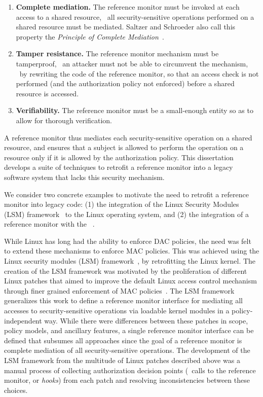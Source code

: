 \begin{enumerate}

\item \textbf{Complete mediation.} The reference monitor must be invoked at
each access to a shared resource, \ie~all security-sensitive operations
performed on a shared resource must be mediated. Saltzer and Schroeder also
call this property the \textit{Principle of Complete Mediation}~\cite{ss75}.

\item \textbf{Tamper resistance.} The reference monitor mechanism must
be tamperproof, \ie~an attacker must not be able to circumvent the mechanism,
\eg~by rewriting the code of the reference monitor, so that an access check is
not performed (and the authorization policy not enforced) before a shared
resource is accessed. 

\item \textbf{Verifiability.} The reference monitor must be a small-enough
entity so as to allow for thorough verification.

\end{enumerate}

A reference monitor thus mediates each security-sensitive operation on a shared
resource, and ensures that a subject is allowed to perform the operation on a
resource only if it is allowed by the authorization policy. This dissertation
develops a suite of techniques to retrofit a reference monitor into a legacy
software system that lacks this security mechanism. 

We consider two concrete examples to motivate the need to retrofit a reference
monitor into legacy code: (1) the integration of the Linux Security Modules
(LSM) framework~\cite{wcs+02} to the Linux operating system, and (2) the
integration of a reference monitor with the \xserver~\cite{xserver}.

While Linux has long had the ability to enforce DAC policies, the need was felt
to extend these mechanisms to enforce MAC policies. This was achieved using the
Linux security modules (LSM) framework~\cite{wcs+02}, by retrofitting the Linux
kernel. The creation of the LSM framework was motivated by the proliferation of
different Linux patches that aimed to improve the default Linux access control
mechanism through finer grained enforcement of MAC
policies~\cite{argus,grsecurity,rsbac,nsa,apparmor,lids}. The LSM framework
generalizes this work to define a reference monitor interface for mediating all
accesses to security-sensitive operations via loadable kernel modules in a
policy-independent way. While there were differences between these patches in
scope, policy models, and ancillary features, a single reference monitor
interface can be defined that subsumes all approaches since the goal of a
reference monitor is complete mediation of all security-sensitive operations.
The development of the LSM framework from the multitude of Linux patches
described above was a manual process of collecting authorization decision
points (\ie~calls to the reference monitor, or \textit{hooks}) from each patch
and resolving inconsistencies between these choices. 


